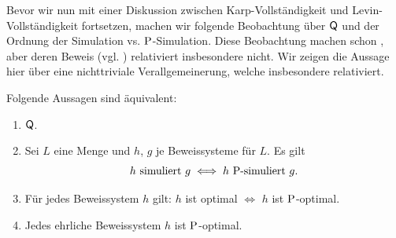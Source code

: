 Bevor wir nun mit einer Diskussion zwischen Karp-Vollständigkeit und Levin-Vollständigkeit fortsetzen, machen wir folgende Beobachtung über $\hQ$ und der Ordnung der Simulation vs. $\P$-Simulation. Diese Beobachtung machen schon \textcite{kobler_is_2000}, aber deren Beweis (vgl. \cite[Thm.~5.2]{messner_simulation_2001}) relativiert insbesondere nicht. Wir zeigen die Aussage hier über eine nichttriviale Verallgemeinerung, welche insbesondere relativiert.
\begin{theorem}\label{thm:q-simulation}
    Folgende Aussagen sind äquivalent:
    \begin{enumerate}
        \item $\hQ$.
        \item Sei $L$ eine Menge und $h$, $g$ je Beweissysteme für $L$. Es gilt
            \[ \text{$h$ simuliert $g$} \iff \text{$h$ $\P$-simuliert $g$}. \]
        \item Für jedes Beweissystem $h$ gilt: $h$ ist optimal $\iff$ $h$ ist $\P$-optimal.
        \item Jedes ehrliche Beweissystem $h$ ist $\P$-optimal.
    \end{enumerate}
\end{theorem}

